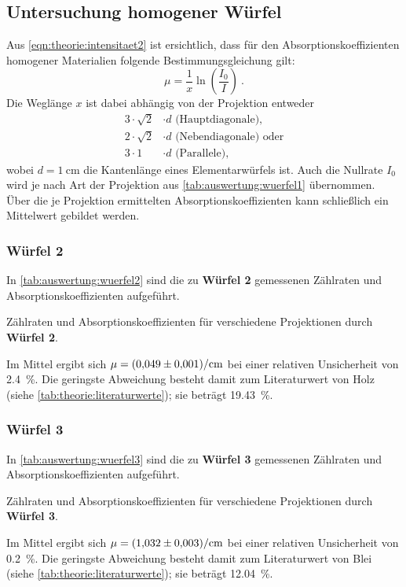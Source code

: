 \subsection{Untersuchung homogener Würfel}
Aus \autoref{eqn:theorie:intensitaet2} ist ersichtlich,
dass für den Absorptionskoeffizienten homogener Materialien folgende Bestimmungsgleichung gilt:
\begin{equation*}
    \mu = \frac{1}{x} \ln \left( \frac{I_0}{I} \right) \ .
\end{equation*}
Die Weglänge $x$ ist dabei abhängig von der Projektion entweder
\begin{align*}
    3·\sqrt{2}&·d \text{ (Hauptdiagonale),} \\
    2·\sqrt{2}&·d \text{ (Nebendiagonale) oder} \\
    3·1       &·d \text{ (Parallele),}
\end{align*}
wobei $d = \SI{1}{\centi\meter}$ die Kantenlänge eines Elementarwürfels ist.
Auch die Nullrate $I_0$ wird je nach Art der Projektion aus \autoref{tab:auswertung:wuerfel1} übernommen.
Über die je Projektion ermittelten Absorptionskoeffizienten kann schließlich ein Mittelwert gebildet werden.


\subsubsection{\textbf{Würfel 2}}
In \autoref{tab:auswertung:wuerfel2} sind die zu \textbf{Würfel 2} gemessenen Zählraten und Absorptionskoeffizienten aufgeführt.
\begin{table}[H]
    \centering
    \caption{Zählraten und Absorptionskoeffizienten für verschiedene Projektionen durch \textbf{Würfel 2}.}
    \label{tab:auswertung:wuerfel2}
\end{table}
Im Mittel ergibt sich $\mu = \SI{0.049 \pm 0.001}{\per\centi\meter}$
bei einer relativen Unsicherheit von \SI{2.4}{\percent}.
Die geringste Abweichung besteht damit zum Literaturwert von Holz (siehe \autoref{tab:theorie:literaturwerte});
sie beträgt \SI{19.43}{\percent}.


\subsubsection{\textbf{Würfel 3}}
In \autoref{tab:auswertung:wuerfel3} sind die zu \textbf{Würfel 3} gemessenen Zählraten und Absorptionskoeffizienten aufgeführt.
\begin{table}[H]
    \centering
    \caption{Zählraten und Absorptionskoeffizienten für verschiedene Projektionen durch \textbf{Würfel 3}.}
    \label{tab:auswertung:wuerfel3}
\end{table}
Im Mittel ergibt sich $\mu = \SI{1.032 \pm 0.003}{\per\centi\meter}$
bei einer relativen Unsicherheit von \SI{0.2}{\percent}.
Die geringste Abweichung besteht damit zum Literaturwert von Blei (siehe \autoref{tab:theorie:literaturwerte});
sie beträgt \SI{12.04}{\percent}.


